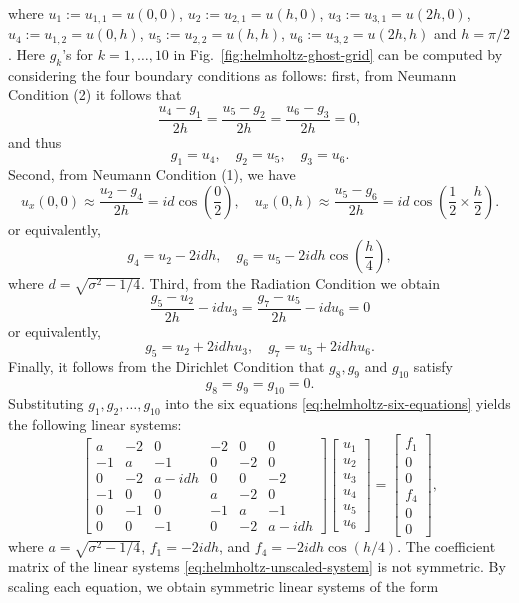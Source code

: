{where $u_1:=u_{1,1}=u(0,0)$, $u_2:=u_{2,1}=u(h,0)$, $u_3:=u_{3,1}=u(2h,0)$, $u_4:=u_{1,2}=u(0,h)$, $u_5:=u_{2,2}=u(h,h)$, $u_6:=u_{3,2}=u(2h,h)$ and $h=\pi/2$. Here $g_k$'s for $k=1,\ldots,10$ in Fig.\ \ref{fig:helmholtz-ghost-grid} can be computed by considering the four boundary conditions as follows: first, from Neumann Condition (2) it follows that}
\[\frac{u_4-g_1}{2h}=\frac{u_5-g_2}{2h}=\frac{u_6-g_3}{2h}=0,\]
{and thus}
\[g_1=u_4,\quad g_2=u_5,\quad g_3=u_6.\]
{Second, from Neumann Condition (1), we have}
\[u_x(0,0)\approx\frac{u_2-g_4}{2h}=id\cos\left(\frac02\right),\quad
u_x(0,h)\approx\frac{u_5-g_6}{2h}=id\cos\left(\frac12\times\frac h2\right).\]
{or equivalently,}
\[g_4=u_2-2idh,\quad g_6=u_5-2idh\cos\left(\frac h4\right),\]
{where $d=\sqrt{\sigma^2-1/4}$. Third, from the Radiation Condition we obtain}
\[\frac{g_5-u_2}{2h}-idu_3=\frac{g_7-u_5}{2h}-idu_6=0\]
{or equivalently,}
\[g_5=u_2+2idhu_3,\quad g_7=u_5+2idhu_6.\]
{Finally, it follows from the Dirichlet Condition that $g_8,g_9$ and $g_{10}$ satisfy}
\[g_8=g_9=g_{10}=0.\]
{Substituting $g_1,g_2,\ldots,g_{10}$ into the six equations \eqref{eq:helmholtz-six-equations} yields the following linear systems:}
\begin{equation}\label{eq:helmholtz-unscaled-system}
\begin{bmatrix}
a&-2&0&-2&0&0\\-1&a&-1&0&-2&0\\0&-2&a-idh&0&0&-2\\
-1&0&0&a&-2&0\\0&-1&0&-1&a&-1\\0&0&-1&0&-2&a-idh
\end{bmatrix}
\begin{bmatrix}u_1\\u_2\\u_3\\u_4\\u_5\\u_6\end{bmatrix}
=\begin{bmatrix}f_1\\0\\0\\f_4\\0\\0\end{bmatrix},
\end{equation}
{where $a=\sqrt{\sigma^2-1/4}$, $f_1=-2idh$, and $f_4=-2idh\cos(h/4)$. The coefficient matrix of the linear systems \eqref{eq:helmholtz-unscaled-system} is not symmetric. By scaling each equation, we obtain symmetric linear systems of the form}
